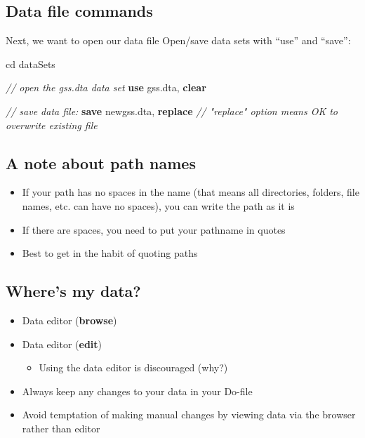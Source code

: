\documentclass[
]{book}
\newenvironment{Shaded}{\begin{snugshade}}{\end{snugshade}}
\newcommand{\CommentTok}[1]{\textcolor[rgb]{0.56,0.35,0.01}{\textit{#1}}}
\newcommand{\KeywordTok}[1]{\textcolor[rgb]{0.13,0.29,0.53}{\textbf{#1}}}
\newcommand{\NormalTok}[1]{#1}
\providecommand{\tightlist}{%
  \setlength{\itemsep}{0pt}\setlength{\parskip}{0pt}}
\begin{document}
\hypertarget{data-file-commands}{%
\subsection{Data file commands}\label{data-file-commands}}

Next, we want to open our data file
Open/save data sets with ``use'' and ``save'':

\begin{Shaded}
\begin{Highlighting}[]
\NormalTok{cd dataSets}

\CommentTok{// open the gss.dta data set}
\KeywordTok{use}\NormalTok{ gss.dta, }\KeywordTok{clear}

\CommentTok{// save data file:}
\KeywordTok{save}\NormalTok{ newgss.dta, }\KeywordTok{replace} \CommentTok{// "replace" option means OK to overwrite existing file}
\end{Highlighting}
\end{Shaded}

\hypertarget{a-note-about-path-names}{%
\subsection{A note about path names}\label{a-note-about-path-names}}

\begin{itemize}
\tightlist
\item
  If your path has no spaces in the name (that means all directories, folders, file names, etc. can have no spaces), you can write the path as it is
\item
  If there are spaces, you need to put your pathname in quotes
\item
  Best to get in the habit of quoting paths
\end{itemize}

\hypertarget{wheres-my-data}{%
\subsection{Where's my data?}\label{wheres-my-data}}

\begin{itemize}
\tightlist
\item
  Data editor (\textbf{browse})
\item
  Data editor (\textbf{edit})

  \begin{itemize}
  \tightlist
  \item
    Using the data editor is discouraged (why?)
  \end{itemize}
\item
  Always keep any changes to your data in your Do-file
\item
  Avoid temptation of making manual changes by viewing data via the browser rather than editor
\end{itemize}
\end{document}

